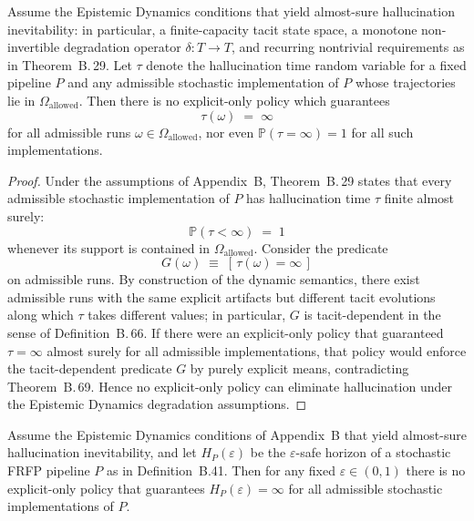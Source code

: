 \begin{corollary}
\label{cor:no-elimination-under-degradation}
Assume the Epistemic Dynamics conditions that yield almost-sure
hallucination inevitability: in particular, a finite-capacity tacit
state space, a monotone non-invertible degradation operator
$\delta \colon T \to T$, and recurring nontrivial requirements as in
Theorem~B.\,29. Let $\tau$ denote the hallucination time random variable
for a fixed pipeline $P$ and any admissible stochastic implementation
of $P$ whose trajectories lie in $\Omega_{\mathrm{allowed}}$.
Then there is no explicit-only policy which guarantees
\[
  \tau(\omega) \;=\; \infty
\]
for all admissible runs $\omega \in \Omega_{\mathrm{allowed}}$, nor even
$\mathbb{P}(\tau = \infty) = 1$ for all such implementations.
\end{corollary}

\begin{proof}
Under the assumptions of Appendix~B, Theorem~B.\,29 states that every
admissible stochastic implementation of $P$ has hallucination time
$\tau$ finite almost surely:
\[
  \mathbb{P}(\tau < \infty) \;=\; 1
\]
whenever its support is contained in $\Omega_{\mathrm{allowed}}$.
Consider the predicate
\[
  G(\omega) \;\equiv\; [\,\tau(\omega) = \infty\,]
\]
on admissible runs. By construction of the dynamic semantics, there
exist admissible runs with the same explicit artifacts but different
tacit evolutions along which $\tau$ takes different values; in
particular, $G$ is tacit-dependent in the sense of
Definition~B.\,66. If there were an explicit-only policy that guaranteed
$\tau = \infty$ almost surely for all admissible implementations, that
policy would enforce the tacit-dependent predicate $G$ by purely
explicit means, contradicting Theorem~B.\,69. Hence no explicit-only
policy can eliminate hallucination under the Epistemic Dynamics degradation
assumptions.
\end{proof}
\begin{corollary}\label{cor:no-infinite-safe-horizon}
Assume the Epistemic Dynamics conditions of Appendix~B that yield almost-sure hallucination
inevitability, and let $H_P(\varepsilon)$ be the $\varepsilon$-safe horizon of a
stochastic FRFP pipeline $P$ as in Definition~B.41. Then for any fixed
$\varepsilon \in (0,1)$ there is no explicit-only policy that guarantees
$H_P(\varepsilon) = \infty$ for all admissible stochastic implementations of $P$.
\end{corollary}

